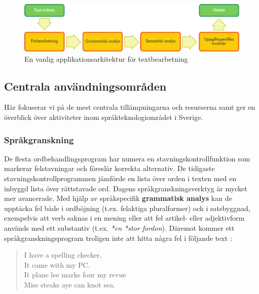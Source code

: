 \begin{multicols}{2}
\begin{figure}[htb]
  \center
  \includegraphics[width=\textwidth]{../_media/swedish/text_processing_app_architecture}
  \caption{En vanlig applikationsarkitektur för textbearbetning}
  \label{fig:textprocessingarch_sv}
\end{figure}

\subsection{Centrala användningsområden} 

Här fokuserar vi på de mest centrala tillämpningarna och resurserna
samt ger en överblick över aktiviteter inom språkteknologiområdet i
Sverige.


\subsubsection{Språkgranskning}

De flesta ordbehandlingsprogram har numera en
stavningskontrollfunktion som markerar felstavningar och föreslår
korrekta alternativ. De tidigaste stavningskontrollprogrammen jämförde
en lista över orden i texten med en inbyggd lista över rättstavade
ord. Dagens språkgranskningsverktyg är mycket mer avancerade. Med
hjälp av språkspecifik \textbf{grammatisk analys} kan de upptäcka fel
både i ordböjning (t.ex. felaktiga pluralformer) och i satsbyggnad,
exempelvis att verb saknas i en mening eller att fel artikel- eller
adjektivform används med ett substantiv (t.ex. \textit{*en *stor
  fordon}). Däremot kommer ett språkgranskningsprogram troligen inte
att hitta några fel i följande text \cite{zar1}:

\begin{quote}
  I have a spelling checker,\\
  It came with my PC.\\
  It plane lee marks four my revue\\
  Miss steaks aye can knot sea.
\end{quote}


\end{multicols}
